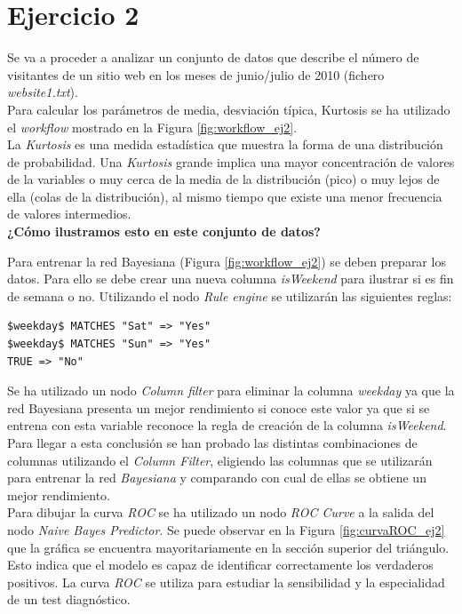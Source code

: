 \documentclass[10pt,a4paper]{article}
\begin{document}
\section{Ejercicio 2}

Se va a proceder a analizar un conjunto de datos que describe el número de visitantes de un sitio web en los meses de junio/julio de 2010 (fichero \emph{website1.txt}).\\

Para calcular los parámetros de media, desviación típica, Kurtosis se ha utilizado el \emph{workflow} mostrado en la Figura \ref{fig:workflow_ej2}.\\
La \emph{Kurtosis} es una medida estadística que muestra la forma de una distribución de probabilidad. Una \emph{Kurtosis} grande implica una mayor concentración de valores de la variables o muy cerca de la media de la distribución (pico) o muy lejos de ella (colas de la distribución), al mismo tiempo que existe una menor frecuencia de valores intermedios.\\
{\LARGE \textbf{¿Cómo ilustramos esto en este conjunto de datos?}\\}

Para entrenar la red Bayesiana (Figura \ref{fig:workflow_ej2}) se deben preparar los datos. Para ello se debe crear una nueva columna \emph{isWeekend} para ilustrar si es fin de semana o no. Utilizando el nodo \emph{Rule engine} se utilizarán las siguientes reglas:

\begin{lstlisting}
$weekday$ MATCHES "Sat" => "Yes"
$weekday$ MATCHES "Sun" => "Yes"
TRUE => "No"
\end{lstlisting}

Se ha utilizado un nodo \emph{Column filter} para eliminar la columna \emph{weekday} ya que la red Bayesiana presenta un mejor rendimiento si conoce este valor ya que si se entrena con esta variable reconoce la regla de creación de la columna \emph{isWeekend}.\\
Para llegar a esta conclusión se han probado las distintas combinaciones de columnas utilizando el \emph{Column Filter}, eligiendo las columnas que se utilizarán para entrenar la red \emph{Bayesiana} y comparando con cual de ellas se obtiene un mejor rendimiento.\\

Para dibujar la curva \emph{ROC} se ha utilizado un nodo \emph{ROC Curve} a la salida del nodo \emph{Naive Bayes Predictor}. Se puede observar en la Figura \ref{fig:curvaROC_ej2} que la gráfica se encuentra mayoritariamente en la sección superior del triángulo. Esto indica que el modelo es capaz de identificar correctamente los verdaderos positivos. La curva \emph{ROC} se utiliza para estudiar la sensibilidad y la especialidad de un test diagnóstico.\\
\end{document}
